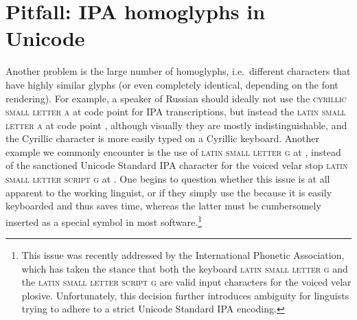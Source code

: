 \section{Pitfall: IPA homoglyphs in Unicode}
\label{pitfall-ipa-homoglyphs}

Another problem is the large number of homoglyphs, i.e.~different characters
that have highly similar glyphs (or even completely identical, depending on the
font rendering). For example, a speaker of Russian should ideally not use the
\textsc{cyrillic small letter a} at code point  for IPA
transcriptions, but instead the \textsc{latin small letter a} at code point
, although visually they are mostly indistinguishable, and the
Cyrillic character is more easily typed on a Cyrillic keyboard. Another example
we commonly encounter is the use of \textsc{latin small letter g} at ,
instead of the sanctioned Unicode Standard IPA character for the voiced velar
stop \textsc{latin small letter script g} at . One begins to question
whether this issue is at all apparent to the working linguist, or if they simply
use the  because it is easily keyboarded and thus saves time, whereas
the latter must be cumbersomely inserted as a special symbol in most
software.\footnote{This issue was recently addressed by the International
Phonetic Association, which has taken the stance that both the keyboard
\textsc{latin small letter g} and the \textsc{latin small letter script g} are
valid input characters for the voiced velar plosive. Unfortunately, this
decision further introduces ambiguity for linguists trying to adhere to a strict
Unicode Standard IPA encoding.}

